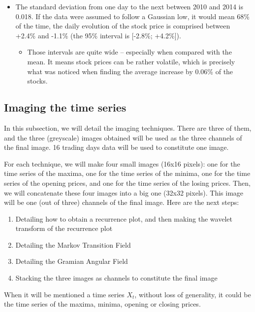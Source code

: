 \documentclass[11pt]{article}
\begin{document}
\begin{onehalfspace}
\begin{itemize}
    \item The standard deviation from one day to the next between 2010 and 2014 is 0.018. If the data were assumed to follow a Gaussian low, it would mean 68\% of the time, the daily evolution of the stock price is comprised between +2.4\% and -1.1\% (the 95\% interval is [-2.8\%; +4.2\%]).
    \begin{itemize}
        \item Those intervals are quite wide -- especially when compared with the mean. It means stock prices can be rather volatile, which is precisely what was noticed when finding the average increase by 0.06\% of the stocks.
    \end{itemize}
\end{itemize}



\subsection{Imaging the time series}

In this subsection, we will detail the imaging techniques. There are three of them, and the three (greyscale) images obtained will be used as the three channels of the final image. 16 trading days data will be used to constitute one image.

For each technique, we will make four small images (16x16 pixels): one for the time series of the maxima, one for the time series of the minima, one for the time series of the opening prices, and one for the time series of the losing prices. Then, we will concatenate these four images into a big one (32x32 pixels). This image will be one (out of three) channels of the final image. Here are the next steps:

\begin{enumerate}
    \item Detailing how to obtain a recurrence plot, and then making the wavelet transform of the recurrence plot
    \item Detailing the Markov Transition Field
    \item Detailing the Gramian Angular Field
    \item Stacking the three images as channels to constitute the final image
\end{enumerate}

When it will be mentioned a time series $X_t$, without loss of generality, it could be the time series of the maxima, minima, opening or closing prices. 


\end{onehalfspace}
\end{document}
